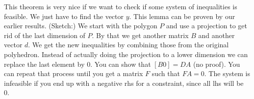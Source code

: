 This theorem is very nice if we want to check if some system of inequalities is feasible. We just have to find the vector $y$. This lemma can be proven by our earlier results. (Sketch:) We start with the polygon $P$ and use a projection to get rid of the last dimension of $P$. By that we get another matrix $B$ and another vector $d$. We get the new inequalities by combining those from the original polyhedron. Instead of actually doing the projection to a lower dimension we can replace the last element by 0. You can show that $[B0]=DA$ (no proof). You can repeat that process until you get a matrix $F$ such that $FA=0$. The system is infeasible if you end up with a negative rhs for a constraint, since all lhs will be 0.